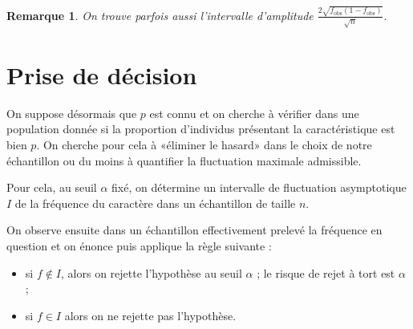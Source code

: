 \documentclass[10pt,a4paper,french]{article}
\theoremstyle{break}
\theoremstyle{plain}
\theoremstyle{nonumberplain}
\newtheorem{remarque}{Remarque}
\theoremstyle{nonumberbreak}
\begin{document}
\begin{remarque}
  On trouve parfois aussi l'intervalle d'amplitude
  $\frac{2\sqrt{f_{\text{obs}}(1-f_{\text{obs}})}}{\sqrt{n}}$.
\end{remarque}

\section{Prise de décision}

On suppose désormais que $p$ est connu et on cherche à vérifier dans une
population donnée si la proportion d'individus présentant la
caractéristique est bien $p$. On cherche pour cela à «éliminer le
hasard» dans le choix de notre échantillon ou du moins à quantifier la
fluctuation maximale admissible.

Pour cela, au seuil $\alpha$ fixé, on détermine un intervalle de
fluctuation asymptotique $I$ de la fréquence du caractère dans un
échantillon de taille $n$.

On observe ensuite dans un échantillon effectivement prelevé la
fréquence en question et on énonce puis applique la règle suivante :
\begin{itemize}
  \item si $f \notin I$, alors on rejette l'hypothèse au seuil $\alpha$
    ; le risque de rejet à tort est $\alpha$ ;
  \item si $f \in I$ alors on ne rejette pas l'hypothèse.
\end{itemize}
\end{document}
